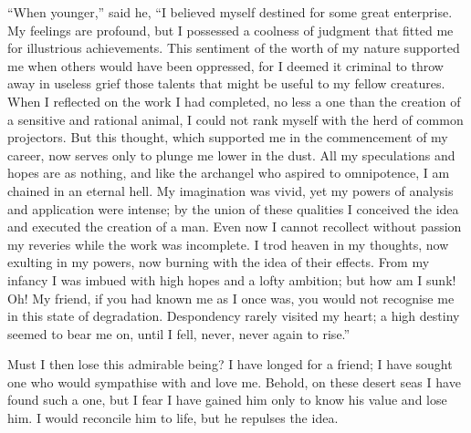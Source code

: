 \documentclass[12pt,openright]{book}
\begin{document}
“When younger,” said he, “I believed myself destined for some great enterprise. My feelings are profound, but I possessed a coolness of judgment that fitted me for illustrious achievements. This sentiment of the worth of my nature supported me when others would have been oppressed, for I deemed it criminal to throw away in useless grief those talents that might be useful to my fellow creatures. When I reflected on the work I had completed, no less a one than the creation of a sensitive and rational animal, I could not rank myself with the herd of common projectors. But this thought, which supported me in the commencement of my career, now serves only to plunge me lower in the dust. All my speculations and hopes are as nothing, and like the archangel who aspired to omnipotence, I am chained in an eternal hell. My imagination was vivid, yet my powers of analysis and application were intense; by the union of these qualities I conceived the idea and executed the creation of a man. Even now I cannot recollect without passion my reveries while the work was incomplete. I trod heaven in my thoughts, now exulting in my powers, now burning with the idea of their effects. From my infancy I was imbued with high hopes and a lofty ambition; but how am I sunk! Oh! My friend, if you had known me as I once was, you would not recognise me in this state of degradation. Despondency rarely visited my heart; a high destiny seemed to bear me on, until I fell, never, never again to rise.”

Must I then lose this admirable being? I have longed for a friend; I have sought one who would sympathise with and love me. Behold, on these desert seas I have found such a one, but I fear I have gained him only to know his value and lose him. I would reconcile him to life, but he repulses the idea.
\end{document}
